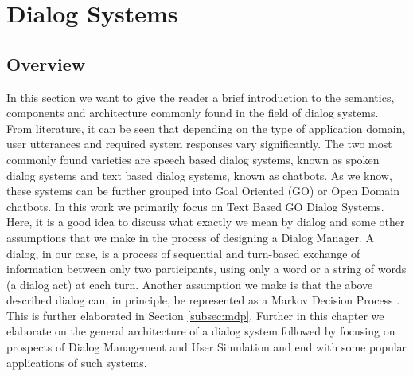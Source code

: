 \documentclass[12pt]{extarticle}
\numberwithin{equation}{section}
\begin{document}
	\section{Dialog Systems}
	\subsection{Overview}
	In this section we want to give the reader a brief introduction to the semantics, components and architecture commonly found in the field of dialog systems. From literature, it can be seen that depending on the type of application domain, user utterances and required system responses vary significantly. The two most commonly found varieties are speech based dialog systems, known as spoken dialog systems and text based dialog systems, known as chatbots. As we know, these systems can be further grouped into Goal Oriented (GO) or Open Domain chatbots. In this work we primarily focus on Text Based GO Dialog Systems. Here, it is a good idea to discuss what exactly we mean by dialog and some other assumptions that we make in the process of designing a Dialog Manager. A dialog, in our case, is a process of sequential and turn-based exchange of information between only two participants, using only a word or a string of words (a dialog act) at each turn. Another assumption we make is that the above described dialog can, in principle,  be represented as a Markov Decision Process \cite{mdp-pieraccini}. This is further elaborated in Section \ref{subsec:mdp}. Further in this chapter we elaborate on the general architecture of a dialog system followed by focusing on prospects of Dialog Management and User Simulation and end with some popular applications of such systems.
\end{document}
